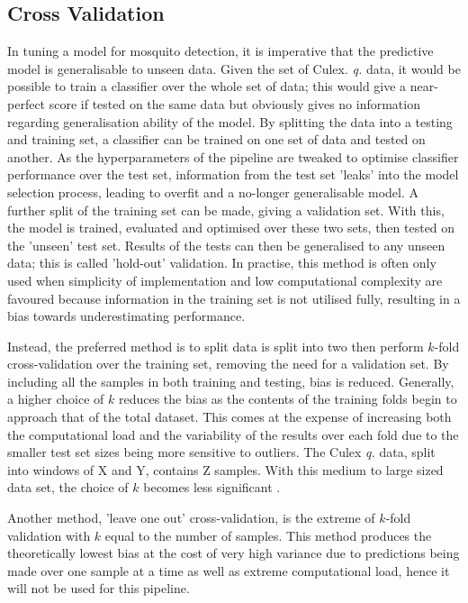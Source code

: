     \subsection{Cross Validation}
    \label{subsec:exp-clf-xval}
        In tuning a model for mosquito detection, it is imperative that the predictive model is generalisable to unseen data. Given the set of Culex. \textit{q.} data, it would be possible to train a classifier over the whole set of data; this would give a near-perfect score if tested on the same data but obviously gives no information regarding generalisation ability of the model. By splitting the data into a testing and training set, a classifier can be trained on one set of data and tested on another. As the hyperparameters of the pipeline are tweaked to optimise classifier performance over the test set, information from the test set 'leaks' into the model selection process, leading to overfit and a no-longer generalisable model. A further split of the training set can be made, giving a validation set. With this, the model is trained, evaluated and optimised over these two sets, then tested on the 'unseen' test set. Results of the tests can then be generalised to any unseen data; this is called 'hold-out' validation. In practise, this method is often only used when simplicity of implementation and low computational complexity are favoured because information in the training set is not utilised fully, resulting in a bias towards underestimating performance.
     
        Instead, the preferred method is to split data is split into two then perform $k$-fold cross-validation over the training set, removing the need for a validation set. By including all the samples in both training and testing, bias is reduced. Generally, a higher choice of $k$ reduces the bias as the contents of the training folds begin to approach that of the total dataset. This comes at the expense of increasing both the computational load and the variability of the results over each fold due to the smaller test set sizes being more sensitive to outliers. The Culex \textit{q.} data, split into windows of X and Y, contains Z samples. With this medium to large sized data set, the choice of $k$ becomes less significant \cite{Kohavi1995}. 
        
        Another method, 'leave one out' cross-validation, is the extreme of $k$-fold validation with $k$ equal to the number of samples. This method produces the theoretically lowest bias at the cost of very high variance due to predictions being made over one sample at a time as well as extreme computational load, hence it will not be used for this pipeline.


